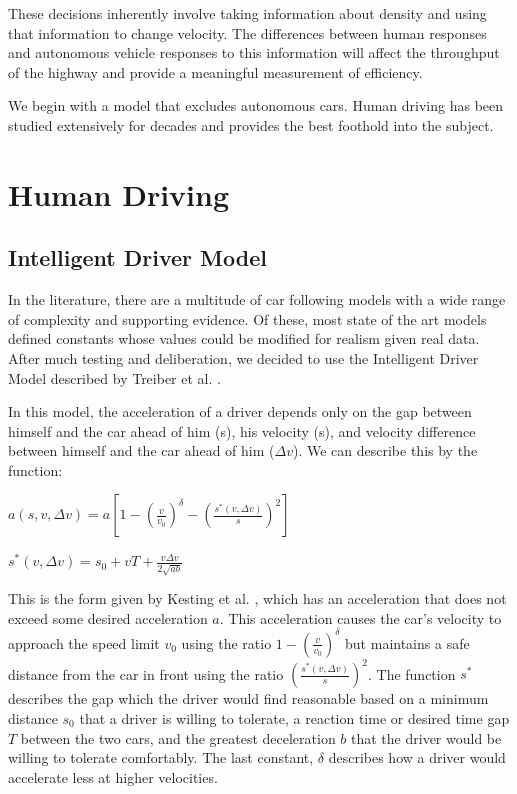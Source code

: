 These decisions inherently involve taking information about density and using that information to change velocity. The differences between human responses and autonomous vehicle responses to this information will affect the throughput of the highway and provide a meaningful measurement of efficiency.

We begin with a model that excludes autonomous cars. Human driving has been studied extensively for decades and provides the best foothold into the subject. 

\chapter{Human Driving}
\thispagestyle{fancy} %


\section{Intelligent Driver Model}

In the literature, there are a multitude of car following models with a wide range of complexity and supporting evidence. Of these, most state of the art models defined constants whose values could be modified for realism given real data. After much testing and deliberation, we decided to use the Intelligent Driver Model described by Treiber et al. \cite{treiber}.

In this model, the acceleration of a driver depends only on the gap between himself and the car ahead of him (s), his velocity (s), and velocity difference between himself and the car ahead of him ($\Delta v$). We can describe this by the function:

$a(s, v, \Delta v) = a \left[1 - \left(\frac{v}{v_0}\right)^\delta - \left( \frac{s^*(v, \Delta v)}{s} \right)^2 \right]$

$s^*(v, \Delta v) = s_0 + vT + \frac{v\Delta v}{2\sqrt{ab}} $

This is the form given by Kesting et al. \cite{kesting}, which has an acceleration that does not exceed some desired acceleration $a$. This acceleration causes the car’s velocity to approach the speed limit $v_0$ using the ratio $ 1 - \left( \frac {v} {v_0} \right) ^ \delta $ but maintains a safe distance from the car in front using the ratio $ \left( \frac {s^*( v, \Delta v )} {s} \right) ^2 $. The function $s^*$ describes the gap which the driver would find reasonable based on a minimum distance $s_0$ that a driver is willing to tolerate, a reaction time or desired time gap $T$ between the two cars, and the greatest deceleration $b$ that the driver would be willing  to tolerate comfortably. The last constant, $\delta$ describes how a driver would accelerate less at higher velocities.

